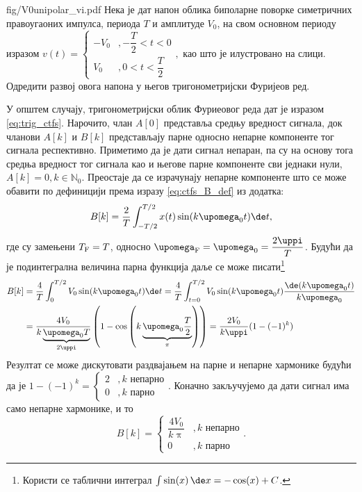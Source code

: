 \noindent\begin{slikaDesno}{fig/V0unipolar_vi.pdf}
\PID \label{z:pravougani_po_def}  Нека је дат напон облика биполарне поворке симетричних правоугаоних импулса, периода $T$ и амплитуде $V_0$, 
на свом основном периоду изразом
$
v(t) = 
\begin{cases}
    -V_0 &, -\dfrac{T}{2} < t < 0 \\[2mm]
    V_0  &, 0 < t < \dfrac{T}{2}
\end{cases},
$ као што је илустровано на слици. Одредити развој овога напона у његов тригонометријски Фуријеов ред.
\end{slikaDesno}
%
\RESENJE
У општем случају, тригонометријски облик Фуриеовог реда дат је изразом \eqref{eq:trig_ctfs}. Нарочито, члан 
$A[0]$ представља средњу вредност сигнала, док чланови $A[k]$ и $B[k]$ представљају парне односно непарне 
компоненте тог сигнала респективно. Приметимо да је дати сигнал непаран, па су на основу тога средња вредност 
тог сигнала као и његове парне компоненте сви једнаки нули, $A[k] = 0, k \in \mathbb N_0$. Преостаје да се 
израчунају непарне компоненте што се може обавити по дефиницији према изразу \eqref{eq:ctfs_B_def} из додатка: 
\begin{eqnarray}
    B[k] = \dfrac{2}{T}\int_{-T/2}^{T/2} x(t) \sin(k\upomega_0 t) \de t, 
\end{eqnarray}
где су замењени $T_{\rm F} = T$, односно $\upomega_{\rm F} = \upomega_0 = \dfrac{2\uppi}{T}$. Будући да је 
подинтегрална величина парна функција даље се  може писати\footnote{Користи се таблични 
интеграл $\int \sin(x)\,\de x = -\cos(x) + C$.}
\begin{align}
    B[k] &= \dfrac{4}{T} \int_0^{T/2} V_0 \sin(k\upomega_0 t) \de t 
         = \dfrac{4}{T} \int_{t = 0}^{T/2} V_0 \sin(k\upomega_0 t) \dfrac{ \de(k \upomega_0 t) }{k \upomega_0} 
         \\
         &= \dfrac{4V_0}{k \underbrace{\upomega_0 T}_{2\uppi}} \left( 1 - \cos\left( k \underbrace{\upomega_0 \dfrac{T}{2}}_{\pi} \right) \right)
         = \dfrac{2V_0}{k\uppi} ( 1 - (-1)^k )
\end{align}
Резултат се може дискутовати раздвајањем на парне и непарне хармонике будући да је 
$1 - (-1)^k = 
\begin{cases}
    2 &, k \text{ непарно} \\
    0 &, k \text{ парно}
\end{cases}$. \vspace*{1mm}
Коначно закључујемо да дати сигнал има само непарне хармонике, и то 
\begin{equation}
B[k] = 
\begin{cases}
    \dfrac{4V_0}{k\uppi} &, k \text{ непарно} \\[2mm]
    0 &, k \text{ парно}
\end{cases}.
\end{equation}